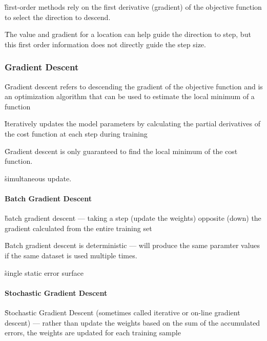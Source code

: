 \r{first-order methods rely on the first derivative (gradient) of the objective function to select the direction to descend.}

\r{The value and gradient for a location can help guide the direction to step, but this first order information does not directly guide the step size.}

\subsubsection{Gradient Descent}

\r{Gradient descent refers to descending the gradient of the objective function and is an optimization algorithm that can be used to estimate the local minimum of a function}

\r{Iteratively updates the model parameters by calculating the partial derivatives of the cost function at each step during training}

\r{Gradient descent is only guaranteed to find the local minimum of the cost function.}

\r{simultaneous update.}





\paragraph{Batch Gradient Descent}

\r{batch gradient descent --- taking a step (update the weights) opposite (down) the gradient calculated from the entire training set}

\r{Batch gradient descent is deterministic --- will produce the same paramter values if the same dataset is used multiple times.}

\r{single static error surface}


\paragraph{Stochastic Gradient Descent}

\r{Stochastic Gradient Descent (sometimes called iterative or on-line gradient descent) --- rather than update the weights based on the sum of the accumulated errors, the weights are updated for each training sample}

